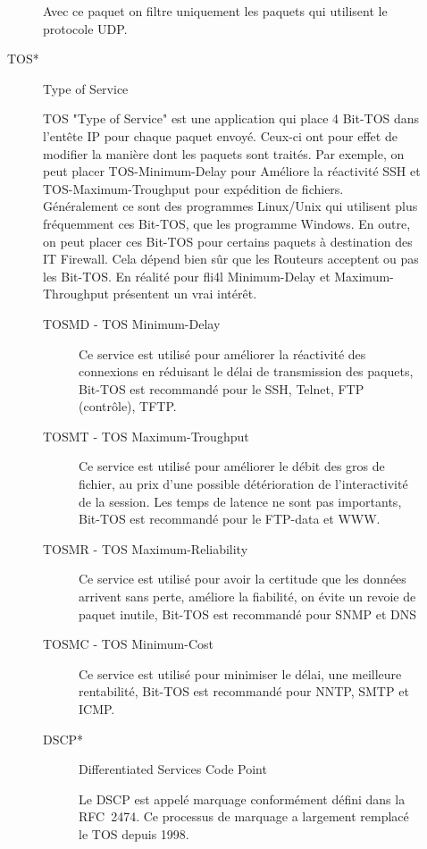 \begin{description}
\begin{description}
    Avec ce paquet on filtre uniquement les paquets qui utilisent le protocole UDP.

  \item[TOS*] Type of Service

    TOS "Type of Service" est une application qui place 4 Bit-TOS dans
    l'entête IP pour chaque paquet envoyé. Ceux-ci ont pour effet de
    modifier la manière dont les paquets sont traités. Par exemple, on
    peut placer TOS-Minimum-Delay pour Améliore la réactivité SSH et
    TOS-Maximum-Troughput pour expédition de fichiers. Généralement ce
    sont des programmes Linux/Unix qui utilisent plus fréquemment ces
    Bit-TOS, que les programme Windows. En outre, on peut placer ces
    Bit-TOS pour certains paquets à destination des IT Firewall. Cela
    dépend bien sûr que les Routeurs acceptent ou pas les Bit-TOS. En
    réalité pour fli4l Minimum-Delay et Maximum-Throughput présentent
    un vrai intérêt.

    \begin{description}
  \item [TOSMD - TOS Minimum-Delay]

    Ce service est utilisé pour améliorer la réactivité des connexions en
    réduisant le délai de transmission des paquets, Bit-TOS est recommandé
    pour le SSH, Telnet, FTP (contrôle), TFTP.

  \item[TOSMT - TOS Maximum-Troughput]

    Ce service est utilisé pour améliorer le débit des gros de fichier, au prix
    d'une possible détérioration de l'interactivité de la session. Les temps de
    latence ne sont pas importants, Bit-TOS est recommandé pour le FTP-data et WWW.

  \item[TOSMR - TOS Maximum-Reliability]

    Ce service est utilisé pour avoir la certitude que les données arrivent
    sans perte, améliore la fiabilité, on évite un revoie de paquet inutile,
    Bit-TOS est recommandé pour SNMP et DNS

  \item[TOSMC - TOS Minimum-Cost]

    Ce service est utilisé pour minimiser le délai, une meilleure rentabilité,
    Bit-TOS est recommandé pour NNTP, SMTP et ICMP.

  \item[DSCP*] Differentiated Services Code Point

    Le DSCP est appelé marquage conformément défini dans la RFC\ 2474.
    Ce processus de marquage a largement remplacé le TOS depuis 1998.


\end{description}
\end{description}
\end{description}
